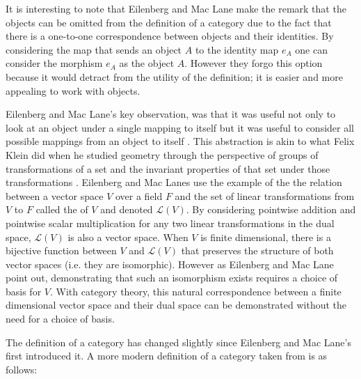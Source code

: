 \documentclass[11pt]{article}
\theoremstyle{definition}
\begin{document}
It is interesting to note that Eilenberg and Mac Lane make the remark that the objects can be omitted from the definition of a category due to the fact that there is a one-to-one correspondence between objects and their identities.
By considering the map that sends an object $A$ to the identity map $e_A$ one can consider the morphism $e_A$ as the object $A$.
However they forgo this option because it would detract from the utility of the definition; it is easier and more appealing to work with objects.

Eilenberg and Mac Lane's key observation, was that it was useful not only to look at an object under a single mapping to itself but it was useful to consider all possible mappings from an object to itself \cite{MarquisJean-Pierre2009FaGP}.
This abstraction is akin to what Felix Klein did when he studied geometry through the perspective of groups of transformations of a set and the invariant properties of that set under those transformations \cite{sep-geometry-19th}.
Eilenberg and Mac Lanes use the example of the the relation between a vector space $V$ over a field $F$ and the set of linear transformations from $V$ to $F$ called the  of $V$ and denoted $\mathcal{L}(V)$.
By considering pointwise addition and pointwise scalar multiplication for any two linear transformations in the dual space, $\mathcal{L}(V)$ is also a vector space. When $V$ is finite dimensional, there is a bijective function between $V$ and $\mathcal{L}(V)$ that preserves the structure of both vector spaces (i.e. they are isomorphic). 
However as Eilenberg and Mac Lane point out, demonstrating that such an isomorphism exists requires a choice of basis for $V$.
With category theory, this natural correspondence between a finite dimensional vector space and their dual space can be demonstrated without the need for a choice of basis.

The definition of a category has changed slightly since Eilenberg and Mac Lane's first introduced it. 
A more modern definition of a category taken from \cite{aluffi2009algebra} is as follows:
\end{document}
